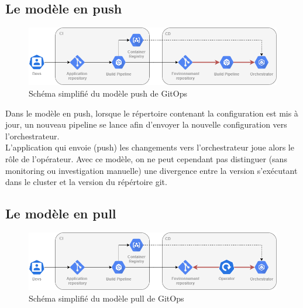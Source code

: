 \documentclass[11pt,fleqn]{book} %
\begin{document}
\subsection{Le modèle en push}
\begin{figure}[H]
\renewcommand{\figurename}{Schéma}
\hspace{-1cm}
\includegraphics[scale=0.6]{Pictures/CI-CD/push-model.png}
\captionsetup{margin=1.5cm,format=hang,justification=justified}
\caption[]{Schéma simplifié du modèle push de GitOps \newline}
\end{figure}

Dans le modèle en push, lorsque le répertoire contenant la configuration est mis à jour, un nouveau pipeline se lance afin d'envoyer la nouvelle configuration vers l'orchestrateur.\\

L'application qui envoie (push) les changements vers l'orchestrateur joue alors le rôle de l'opérateur. Avec ce modèle, on ne peut cependant pas distinguer (sans monitoring ou investigation manuelle) une divergence entre la version s'exécutant dans le cluster et la version du répértoire git. 

\subsection{Le modèle en pull}
\begin{figure}[H]
\renewcommand{\figurename}{Schéma}
\hspace{-1cm}
\includegraphics[scale=0.6]{Pictures/CI-CD/pull-model.png}
\captionsetup{margin=1.5cm,format=hang,justification=justified}
\caption[]{Schéma simplifié du modèle pull de GitOps \newline}
\end{figure}
\end{document}
